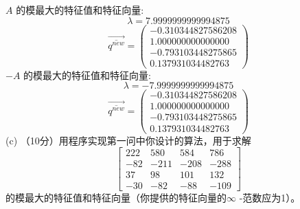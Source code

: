 \documentclass[12pt,a4paper,UTF8]{ctexart}
\begin{document}
\begin{enumerate}
          $A$ 的模最大的特征值和特征向量:
          \begin{equation}
              \lambda = 7.9999999999994875
          \end{equation}
          \begin{equation}
              \overrightarrow{\overline{q^{new}} }=\left(\begin{array}{c}
                      -0.310344827586208 \\
                      1.000000000000000  \\
                      -0.793103448275865 \\
                      0.137931034482763
                  \end{array}\right)
          \end{equation}
          $-A$ 的模最大的特征值和特征向量:
          \begin{equation}
              \lambda = -7.9999999999994875
          \end{equation}
          \begin{equation}
              \overrightarrow{\overline{q^{new}} }=\left(\begin{array}{c}
                      -0.310344827586208 \\
                      1.000000000000000  \\
                      -0.793103448275865 \\
                      0.137931034482763
                  \end{array}\right)
          \end{equation}
          (c) （10分）用程序实现第一问中你设计的算法，用于求解
          \begin{equation}
              \left[\begin{array}{rrrr}
                      222 & 580  & 584  & 786  \\
                      -82 & -211 & -208 & -288 \\
                      37  & 98   & 101  & 132  \\
                      -30 & -82  & -88  & -109
                  \end{array}\right]
          \end{equation}
          的模最大的特征值和特征向量（你提供的特征向量的$\infty$ -范数应为1）。


\end{enumerate}
\end{document}
